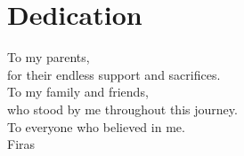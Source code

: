\chapter*{Dedication}
\thispagestyle{empty}

\vspace*{3cm}
\begin{flushright}
\itshape
\large

To my parents,\\
for their endless support and sacrifices.\\[1cm]

To my family and friends,\\
who stood by me throughout this journey.\\[1cm]

To everyone who believed in me.\\[2cm]

\normalsize\upshape Firas
\end{flushright}
